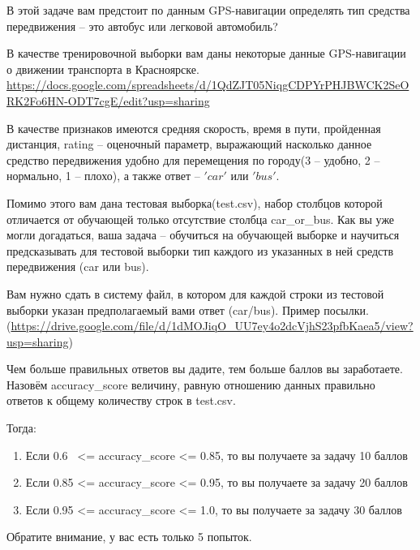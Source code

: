 
В этой задаче вам предстоит по данным GPS-навигации определять тип средства передвижения -- это автобус или легковой автомобиль?


В качестве тренировочной выборки вам даны некоторые данные GPS-навигации о движении транспорта в Красноярске.\\ \url{https://docs.google.com/spreadsheets/d/1QdZJT05NiqgCDPYrPHJBWCK2SeORK2Fo6HN-ODT7cgE/edit?usp=sharing}

В качестве признаков имеются средняя скорость, время в пути, пройденная дистанция,  rating -- оценочный параметр, выражающий насколько данное средство передвижения удобно для перемещения по городу(3 -- удобно, 2 -- нормально, 1 -- плохо), а также ответ --  $'car'$ или $'bus'$.

Помимо этого вам дана тестовая выборка(test.csv), набор столбцов которой отличается от 
обучающей только отсутствие столбца car\_or\_bus. Как вы уже могли догадаться, ваша задача -- 
обучиться на обучающей выборке и научиться предсказывать для тестовой выборки тип каждого из 
указанных в ней средств передвижения (car или bus).

\outputfmtSection

Вам нужно сдать в систему файл, в котором для каждой строки из тестовой выборки указан предполагаемый вами ответ (car/bus). Пример посылки. (\url{https://drive.google.com/file/d/1dMOJiqO_UU7ey4o2dcVjhS23pfbKaea5/view?usp=sharing})

\markSection

Чем больше правильных ответов вы дадите, тем больше баллов вы заработаете. 
Назовём accuracy\_score величину, равную отношению данных правильно ответов к общему количеству строк в 
test.csv. 

Тогда:

\begin{enumerate}
    \item Если 0.6  <= accuracy\_score <= 0.85, то вы получаете за задачу 10 баллов
    \item Если 0.85 <= accuracy\_score <= 0.95, то вы получаете за задачу 20 баллов
    \item Если 0.95 <= accuracy\_score <= 1.0, то вы получаете за задачу 30 баллов
\end{enumerate}

Обратите внимание, у вас есть только 5 попыток.

\solutionSection

